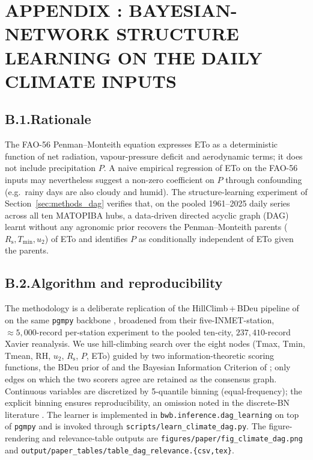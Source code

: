 
\section*{APPENDIX \thesection: BAYESIAN-NETWORK STRUCTURE LEARNING ON THE DAILY CLIMATE INPUTS}
\label{app:dag}

\subsection*{B.1.\quad Rationale}

The FAO-56 Penman--Monteith equation
\citep{Allen1998} expresses ETo as a deterministic function of net
radiation, vapour-pressure deficit and aerodynamic terms; it does
not include precipitation $P$. A naive empirical regression of ETo
on the FAO-56 inputs may nevertheless suggest a non-zero coefficient
on $P$ through confounding (e.g.\ rainy days are also cloudy and
humid). The structure-learning experiment of
Section~\ref{sec:methods_dag} verifies that, on the pooled
1961--2025 daily series across all ten MATOPIBA hubs, a
data-driven directed acyclic graph (DAG) learnt without any
agronomic prior recovers the Penman--Monteith parents
($R_{\mathrm{s}}, T_{\mathrm{min}}, u_2$) of ETo and identifies $P$
as conditionally independent of ETo given the parents.

\subsection*{B.2.\quad Algorithm and reproducibility}

The methodology is a deliberate replication of the
HillClimb\,+\,BDeu pipeline of \citet{Ribeiro2022} on the same
\verb|pgmpy| backbone \citep{Ankan2015}, broadened from their
five-INMET-station, $\approx\!5{,}000$-record per-station experiment
to the pooled ten-city, $237{,}410$-record Xavier reanalysis. We
use hill-climbing search \citep{Russell2010} over the eight nodes
(Tmax, Tmin, Tmean, RH, $u_2$, $R_{\mathrm{s}}$, $P$, ETo) guided
by two information-theoretic scoring functions, the BDeu prior of
\citet{Buntine1991} and the Bayesian Information Criterion of
\citet{Schwarz1978}; only edges on which the two scorers agree are
retained as the consensus graph. Continuous variables are
discretized by 5-quantile binning (equal-frequency); the explicit
binning ensures reproducibility, an omission noted in the
discrete-BN literature \citep{Hui2022}. The learner is implemented
in \verb|bwb.inference.dag_learning| on top of \verb|pgmpy|
\citep{Ankan2015} and is invoked through
\verb|scripts/learn_climate_dag.py|. The figure-rendering and
relevance-table outputs are
\verb|figures/paper/fig_climate_dag.png| and
\verb|output/paper_tables/table_dag_relevance.{csv,tex}|.

